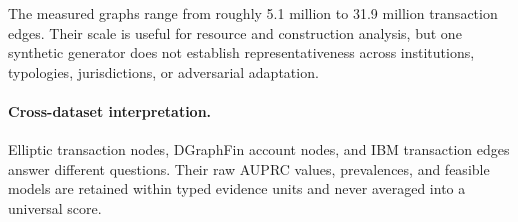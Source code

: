 

The measured graphs range from roughly 5.1 million to 31.9 million transaction edges. Their scale is useful for resource and construction analysis, but one synthetic generator does not establish representativeness across institutions, typologies, jurisdictions, or adversarial adaptation.

\paragraph{Cross-dataset interpretation.}
Elliptic transaction nodes, DGraphFin account nodes, and IBM transaction edges answer different questions. Their raw AUPRC values, prevalences, and feasible models are retained within typed evidence units and never averaged into a universal score.
